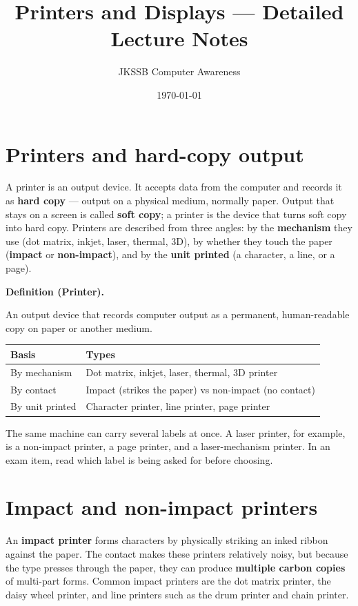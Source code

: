 \documentclass[11pt]{article}
\title{Printers and Displays --- Detailed Lecture Notes}
\author{JKSSB Computer Awareness}
\date{\today}
\newenvironment{definitionbox}[1]{%
  \par\noindent\textbf{Definition (#1).}\ \itshape
}{\par\vspace{0.3em}}
\begin{document}
\maketitle

\section{Printers and hard-copy output}
A printer is an output device. It accepts data from the computer and records
it as \textbf{hard copy} --- output on a physical medium, normally paper.
Output that stays on a screen is called \textbf{soft copy}; a printer is the
device that turns soft copy into hard copy. Printers are described from three
angles: by the \textbf{mechanism} they use (dot matrix, inkjet, laser,
thermal, 3D), by whether they touch the paper (\textbf{impact} or
\textbf{non-impact}), and by the \textbf{unit printed} (a character, a line,
or a page).

\begin{definitionbox}{Printer}
An output device that records computer output as a permanent, human-readable
copy on paper or another medium.
\end{definitionbox}

\begin{center}
\begin{tabular}{p{}p{}}
\toprule
\textbf{Basis} & \textbf{Types} \\
\midrule
By mechanism & Dot matrix, inkjet, laser, thermal, 3D printer \\
By contact & Impact (strikes the paper) vs non-impact (no contact) \\
By unit printed & Character printer, line printer, page printer \\
\bottomrule
\end{tabular}
\end{center}

The same machine can carry several labels at once. A laser printer, for
example, is a non-impact printer, a page printer, and a laser-mechanism
printer. In an exam item, read which label is being asked for before choosing.

\section{Impact and non-impact printers}
An \textbf{impact printer} forms characters by physically striking an inked
ribbon against the paper. The contact makes these printers relatively noisy,
but because the type presses through the paper, they can produce
\textbf{multiple carbon copies} of multi-part forms. Common impact printers
are the dot matrix printer, the daisy wheel printer, and line printers such
as the drum printer and chain printer.
\end{document}
